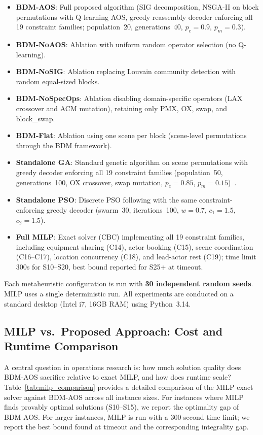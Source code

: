 \begin{itemize}
    \item \textbf{BDM-AOS}: Full proposed algorithm (SIG decomposition, NSGA-II on block permutations with Q-learning AOS, greedy reassembly decoder enforcing all 19 constraint families; population~20, generations~40, $p_c{=}0.9$, $p_m{=}0.3$).
    \item \textbf{BDM-NoAOS}: Ablation with uniform random operator selection (no Q-learning).
    \item \textbf{BDM-NoSIG}: Ablation replacing Louvain community detection with random equal-sized blocks.
    \item \textbf{BDM-NoSpecOps}: Ablation disabling domain-specific operators (LAX crossover and ACM mutation), retaining only PMX, OX, swap, and block\_swap.
    \item \textbf{BDM-Flat}: Ablation using one scene per block (scene-level permutations through the BDM framework).
    \item \textbf{Standalone GA}: Standard genetic algorithm on scene permutations with greedy decoder enforcing all 19 constraint families (population~50, generations~100, OX crossover, swap mutation, $p_c{=}0.85$, $p_m{=}0.15$)~\citep{goncalves2011}.
    \item \textbf{Standalone PSO}: Discrete PSO following \citet{kennedy1995} with the same constraint-enforcing greedy decoder (swarm~30, iterations~100, $w{=}0.7$, $c_1{=}1.5$, $c_2{=}1.5$).
    \item \textbf{Full MILP}: Exact solver (CBC) implementing all 19 constraint families, including equipment sharing (C14), actor booking (C15), scene coordination (C16--C17), location concurrency (C18), and lead-actor rest (C19); time limit 300s for S10--S20, best bound reported for S25+ at timeout.
\end{itemize}

Each metaheuristic configuration is run with \textbf{30 independent random seeds}.
MILP uses a single deterministic run.
All experiments are conducted on a standard desktop (Intel i7, 16GB RAM) using Python~3.14.

\subsection{MILP vs.\ Proposed Approach: Cost and Runtime Comparison}
\label{sec:milp_comparison}

A central question in operations research is: how much solution quality does BDM-AOS sacrifice relative to exact MILP, and how does runtime scale?
Table~\ref{tab:milp_comparison} provides a detailed comparison of the MILP exact solver against BDM-AOS across all instance sizes.
For instances where MILP finds provably optimal solutions (S10--S15), we report the optimality gap of BDM-AOS.
For larger instances, MILP is run with a 300-second time limit; we report the best bound found at timeout and the corresponding integrality gap.

